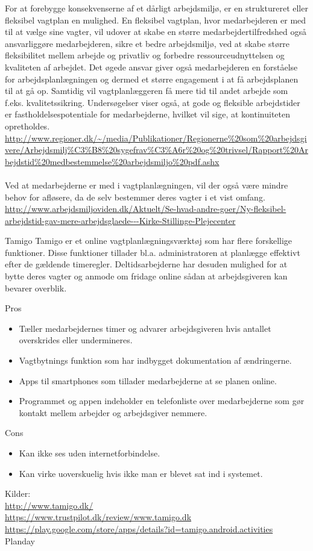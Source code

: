 \documentclass[11pt, twoside, a4paper, openright]{report}
\begin{document}
For at forebygge konsekvenserne af et dårligt arbejdsmiljø, er en struktureret eller fleksibel vagtplan en mulighed.
En fleksibel vagtplan, hvor medarbejderen er med til at vælge sine vagter, vil udover at skabe en større medarbejdertilfredshed også ansvarliggøre medarbejderen, sikre et bedre arbejdsmiljø, ved at skabe større fleksibilitet mellem arbejde og privatliv og forbedre ressourceudnyttelsen og kvaliteten af arbejdet. Det øgede ansvar giver også medarbejderen en forståelse for arbejdsplanlægningen og dermed et større engagement i at få arbejdsplanen til at gå op.
Samtidig vil vagtplanlæggeren få mere tid til andet arbejde som f.eks. kvalitetssikring.
Undersøgelser viser også, at gode og fleksible arbejdstider er fastholdelsespotentiale for medarbejderne, hvilket vil sige, at kontinuiteten opretholdes.
\\
\url{http://www.regioner.dk/~/media/Publikationer/Regionerne%20som%20arbejdsgivere/Arbejdsmilj%C3%B8%20sygefrav%C3%A6r%20og%20trivsel/Rapport%20Arbejdstid%20medbestemmelse%20arbejdsmiljo%20pdf.ashx}
\\\\
Ved at medarbejderne er med i vagtplanlægningen, vil der også være mindre behov for afløsere, da de selv bestemmer deres vagter i et vist omfang.
\\
\url{http://www.arbejdsmiljoviden.dk/Aktuelt/Se-hvad-andre-goer/Ny-fleksibel-arbejdstid-gav-mere-arbejdsglaede---Kirke-Stillinge-Plejecenter}

\newpage

Tamigo
Tamigo er et online vagtplanlægningsværktøj som har flere forskellige funktioner. Disse funktioner tillader bl.a. administratoren at planlægge effektivt efter de gældende timeregler. Deltidsarbejderne har desuden mulighed for at bytte deres vagter og anmode om fridage online sådan at arbejdsgiveren kan bevarer overblik.

Pros
\begin{itemize}
\item Tæller medarbejdernes timer og advarer arbejdsgiveren hvis antallet overskrides eller undermineres.
\item Vagtbytnings funktion som har indbygget dokumentation af ændringerne.
\item Apps til smartphones som tillader medarbejderne at se planen online.
\item Programmet og appen indeholder en telefonliste over medarbejderne som gør kontakt mellem arbejder og arbejdsgiver nemmere.
\end{itemize}
Cons
\begin{itemize}
\item Kan ikke ses uden internetforbindelse.
\item Kan virke uoverskuelig hvis ikke man er blevet sat ind i systemet.
\end{itemize}
Kilder:
\\
\url{http://www.tamigo.dk/}
\\
\url{https://www.trustpilot.dk/review/www.tamigo.dk}
\\
\url{https://play.google.com/store/apps/details?id=tamigo.android.activities}
\\
Planday
\end{document}
